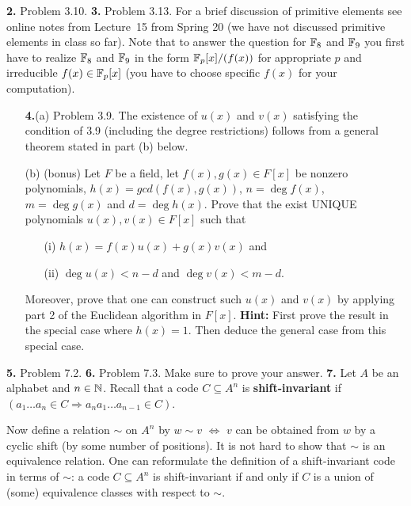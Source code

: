 \documentclass[12pt]{amsart}
\begin{document}
\skv
{\bf 2.} Problem 3.10.
\skv
{\bf 3.} Problem 3.13. For a brief discussion of primitive elements see online notes from Lecture~15 from Spring 20 (we have not discussed primitive elements in class so far). Note that to answer the question for ${\mathbb F}_8$ and ${\mathbb F}_9$ you first have to realize ${\mathbb F}_8$ and ${\mathbb F}_9$ in the form ${\mathbb F}_p[x]/(f(x))$
for appropriate $p$ and irreducible $f(x)\in{\mathbb F}_p[x]$ (you have to choose specific $f(x)$ for your computation).
\skv
\begin{itemize}
\item[{\bf 4.}(a)] Problem 3.9. The existence of $u(x)$ and $v(x)$ satisfying the condition of 3.9 (including the degree restrictions) follows from a general
theorem stated in part (b) below.
\item[(b)] (bonus) Let $F$ be a field, let $f(x),g(x)\in F[x]$ be nonzero polynomials,  $h(x)=gcd(f(x),g(x))$, $n=\deg f(x)$, $m=\deg g(x)$ and
$d=\deg h(x)$. Prove that the exist UNIQUE polynomials $u(x),v(x)\in F[x]$ such that 
\begin{itemize}
\item[(i)] $h(x)=f(x)u(x)+g(x)v(x)$ and
\item[(ii)] $\deg u(x)<n-d$ and $\deg v(x)<m-d$.
\end{itemize}
Moreover, prove that one can construct such $u(x)$ and $v(x)$ by applying part 2 of the Euclidean algorithm in $F[x]$. {\bf Hint:}
First prove the result in the special case where $h(x)=1$. Then deduce the general case from this special case.

\end{itemize}
\skv

{\bf 5.} Problem 7.2.
\skv
{\bf 6.} Problem 7.3. Make sure to prove your answer.
\skv
{\bf 7.} Let $A$ be an alphabet and $n\in{\mathbb N}$. Recall that a code $C\subseteq A^n$ is {\bf shift-invariant} if 
$(a_1\ldots a_n\in C \Rightarrow a_n a_1\ldots a_{n-1}\in C)$. 

Now define a relation $\sim$ on $A^n$ by $w\sim v$ $\iff$ $v$ can be obtained from $w$ by a cyclic shift (by some number of positions). It is not hard to show that $\sim$ is an equivalence relation. One can reformulate the definition of a shift-invariant code in terms of $\sim$: a code $C\subseteq A^n$ is shift-invariant if and only if $C$ is a union of (some) equivalence classes with respect to $\sim$.
\end{document}
